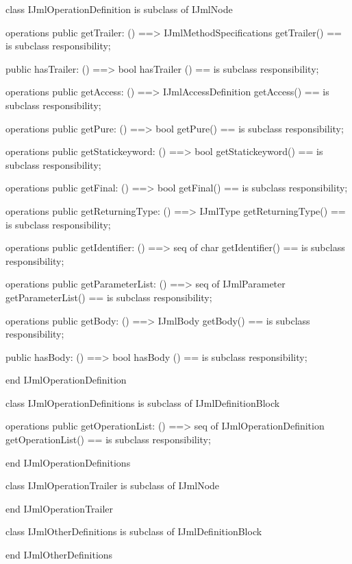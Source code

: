 \begin{vdm_al}
class IJmlOperationDefinition
 is subclass of IJmlNode

operations
  public getTrailer: () ==> IJmlMethodSpecifications
  getTrailer() == is subclass responsibility;

  public hasTrailer: () ==> bool
  hasTrailer () == is subclass responsibility;

operations
  public getAccess: () ==> IJmlAccessDefinition
  getAccess() == is subclass responsibility;

operations
  public getPure: () ==> bool
  getPure() == is subclass responsibility;

operations
  public getStatickeyword: () ==> bool
  getStatickeyword() == is subclass responsibility;

operations
  public getFinal: () ==> bool
  getFinal() == is subclass responsibility;

operations
  public getReturningType: () ==> IJmlType
  getReturningType() == is subclass responsibility;

operations
  public getIdentifier: () ==> seq of char
  getIdentifier() == is subclass responsibility;

operations
  public getParameterList: () ==> seq of IJmlParameter
  getParameterList() == is subclass responsibility;

operations
  public getBody: () ==> IJmlBody
  getBody() == is subclass responsibility;

  public hasBody: () ==> bool
  hasBody () == is subclass responsibility;

end IJmlOperationDefinition
\end{vdm_al}

\begin{vdm_al}
class IJmlOperationDefinitions
 is subclass of IJmlDefinitionBlock

operations
  public getOperationList: () ==> seq of IJmlOperationDefinition
  getOperationList() == is subclass responsibility;

end IJmlOperationDefinitions
\end{vdm_al}

\begin{vdm_al}
class IJmlOperationTrailer
 is subclass of IJmlNode

end IJmlOperationTrailer
\end{vdm_al}

\begin{vdm_al}
class IJmlOtherDefinitions
 is subclass of IJmlDefinitionBlock

end IJmlOtherDefinitions
\end{vdm_al}

